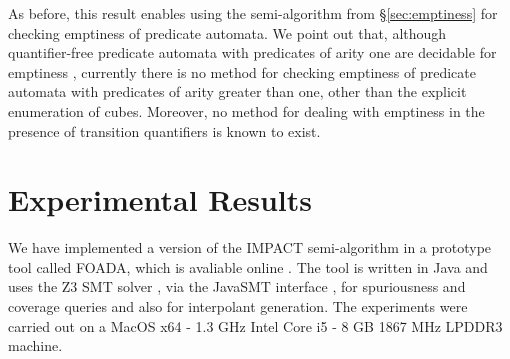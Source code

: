 As before, this result enables using the
semi-algorithm from \S\ref{sec:emptiness} for checking emptiness of
predicate automata.  We point out that, although quantifier-free
predicate automata with predicates of arity one are decidable for
emptiness \cite{Farzan15}, currently there is no method for checking
emptiness of predicate automata with predicates of arity greater than
one, other than the explicit enumeration of cubes. Moreover, no method
for dealing with emptiness in the presence of transition quantifiers
is known to exist.
\fi

\section{Experimental Results}

We have implemented a version of the IMPACT semi-algorithm
\cite{McMillan06} in a prototype tool called FOADA, which is avaliable
online \cite{foada}. The tool is written in Java and uses the Z3 SMT
solver \cite{z3}, via the JavaSMT interface \cite{javasmt}, for
spuriousness and coverage queries and also for interpolant generation.
The experiments were carried out on a MacOS x64 - 1.3 GHz Intel Core
i5 - 8 GB 1867 MHz LPDDR3 machine.


